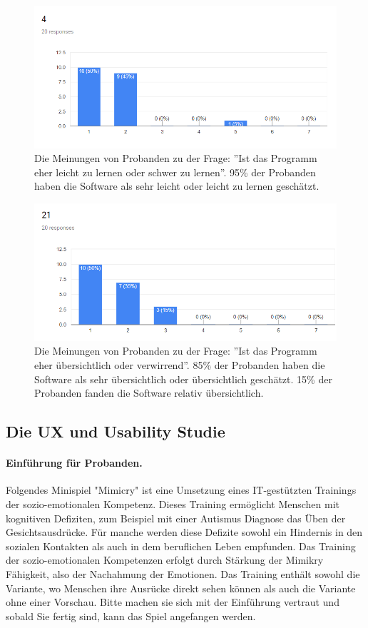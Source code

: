 \begin{figure}[!ht]
    \centering\includegraphics[width=330pt]{res/4_ueq}
\caption{Die Meinungen von Probanden zu der Frage: ''Ist das Programm eher leicht zu lernen oder schwer zu lernen''. 95\% der Probanden haben die Software als sehr leicht oder leicht zu lernen geschätzt.}
\label{item_4}
\end{figure}

\begin{figure}[!ht]
    \centering\includegraphics[width=330pt]{res/21_ueq}
\caption{Die Meinungen von Probanden zu der Frage: ''Ist das Programm eher übersichtlich oder verwirrend''. 85\% der Probanden haben die Software als sehr übersichtlich oder übersichtlich geschätzt. 15\% der Probanden fanden die Software relativ übersichtlich.}
\label{item_21}
\end{figure}

\newpage
\subsection{Die UX und Usability Studie}
\paragraph{Einführung für Probanden.}Folgendes Minispiel "Mimicry" ist eine Umsetzung eines IT-gestützten Trainings der sozio-emotionalen Kompetenz. Dieses Training ermöglicht Menschen mit kognitiven Defiziten, zum Beispiel mit einer Autismus Diagnose das Üben der Gesichtsausdrücke. Für manche werden diese Defizite sowohl ein Hindernis in den sozialen Kontakten als auch in dem beruflichen Leben empfunden. Das Training der sozio-emotionalen Kompetenzen erfolgt durch Stärkung der Mimikry Fähigkeit, also der Nachahmung der Emotionen. 
Das Training enthält sowohl die Variante, wo Menschen ihre Ausrücke direkt sehen können als auch die Variante ohne einer Vorschau.
Bitte machen sie sich mit der Einführung vertraut und sobald Sie fertig sind, kann das Spiel angefangen werden.
\label{einf}

